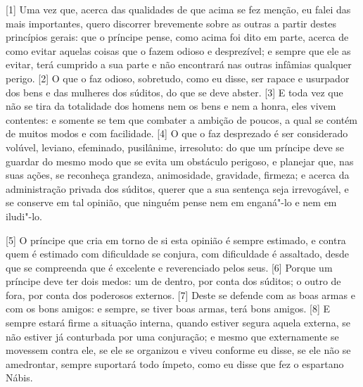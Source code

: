 {[}1{]} Uma vez que, acerca das qualidades de que acima se fez menção, eu falei das mais importantes, quero
discorrer brevemente sobre as outras a partir destes princípios gerais:
que o príncipe pense, como acima foi dito em parte, acerca de como evitar aquelas coisas que
o fazem odioso e desprezível; e sempre que ele as evitar, terá cumprido
a sua parte e não encontrará nas outras infâmias qualquer perigo.
{[}2{]} O que o faz odioso, sobretudo, como eu disse, ser rapace e usurpador dos bens e das mulheres dos
súditos, do que se deve abster. {[}3{]} E toda vez que não se tira da
totalidade dos homens nem os bens e nem a
honra, eles vivem contentes: e somente se tem que combater a ambição de
poucos, a qual se contém de muitos modos e com facilidade. {[}4{]} O que
o faz desprezado é ser considerado volúvel, leviano, efeminado,
pusilânime, irresoluto: do que um príncipe deve se guardar do mesmo modo
que se evita um obstáculo perigoso, e planejar que, nas suas ações, se
reconheça grandeza, animosidade, gravidade, firmeza; e acerca da
administração privada dos súditos, querer que a sua sentença seja
irrevogável, e se conserve em tal opinião, que ninguém pense nem em
enganá"-lo e nem em iludi"-lo.

{[}5{]} O príncipe que cria em torno de si esta opinião é sempre
estimado, e contra quem é estimado com dificuldade se conjura, com
dificuldade é assaltado, desde que se compreenda que é excelente e
reverenciado pelos seus. {[}6{]} Porque um príncipe deve ter dois medos:
um de dentro, por conta dos súditos; o outro de fora, por conta dos
poderosos externos. {[}7{]} Deste se defende com as boas armas e com os
bons amigos: e sempre, se tiver boas armas, terá bons amigos. {[}8{]} E
sempre estará firme a situação interna, quando estiver segura aquela
externa, se não estiver já conturbada por uma conjuração; e mesmo que
externamente se movessem contra ele, se ele se organizou e viveu
conforme eu disse, se ele não se amedrontar, sempre suportará todo
ímpeto, como eu disse que fez o espartano Nábis.

